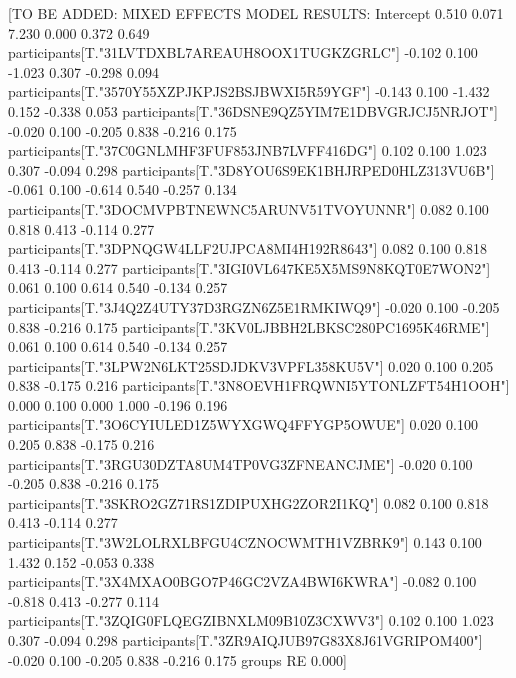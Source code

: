 \documentclass[10pt,letterpaper,twocolumn]{article}
\begin{document}
[TO BE ADDED: MIXED EFFECTS MODEL RESULTS:
Intercept                                         0.510    0.071  7.230 0.000  0.372  0.649
participants[T."31LVTDXBL7AREAUH8OOX1TUGKZGRLC"] -0.102    0.100 -1.023 0.307 -0.298  0.094
participants[T."3570Y55XZPJKPJS2BSJBWXI5R59YGF"] -0.143    0.100 -1.432 0.152 -0.338  0.053
participants[T."36DSNE9QZ5YIM7E1DBVGRJCJ5NRJOT"] -0.020    0.100 -0.205 0.838 -0.216  0.175
participants[T."37C0GNLMHF3FUF853JNB7LVFF416DG"]  0.102    0.100  1.023 0.307 -0.094  0.298
participants[T."3D8YOU6S9EK1BHJRPED0HLZ313VU6B"] -0.061    0.100 -0.614 0.540 -0.257  0.134
participants[T."3DOCMVPBTNEWNC5ARUNV51TVOYUNNR"]  0.082    0.100  0.818 0.413 -0.114  0.277
participants[T."3DPNQGW4LLF2UJPCA8MI4H192R8643"]  0.082    0.100  0.818 0.413 -0.114  0.277
participants[T."3IGI0VL647KE5X5MS9N8KQT0E7WON2"]  0.061    0.100  0.614 0.540 -0.134  0.257
participants[T."3J4Q2Z4UTY37D3RGZN6Z5E1RMKIWQ9"] -0.020    0.100 -0.205 0.838 -0.216  0.175
participants[T."3KV0LJBBH2LBKSC280PC1695K46RME"]  0.061    0.100  0.614 0.540 -0.134  0.257
participants[T."3LPW2N6LKT25SDJDKV3VPFL358KU5V"]  0.020    0.100  0.205 0.838 -0.175  0.216
participants[T."3N8OEVH1FRQWNI5YTONLZFT54H1OOH"]  0.000    0.100  0.000 1.000 -0.196  0.196
participants[T."3O6CYIULED1Z5WYXGWQ4FFYGP5OWUE"]  0.020    0.100  0.205 0.838 -0.175  0.216
participants[T."3RGU30DZTA8UM4TP0VG3ZFNEANCJME"] -0.020    0.100 -0.205 0.838 -0.216  0.175
participants[T."3SKRO2GZ71RS1ZDIPUXHG2ZOR2I1KQ"]  0.082    0.100  0.818 0.413 -0.114  0.277
participants[T."3W2LOLRXLBFGU4CZNOCWMTH1VZBRK9"]  0.143    0.100  1.432 0.152 -0.053  0.338
participants[T."3X4MXAO0BGO7P46GC2VZA4BWI6KWRA"] -0.082    0.100 -0.818 0.413 -0.277  0.114
participants[T."3ZQIG0FLQEGZIBNXLM09B10Z3CXWV3"]  0.102    0.100  1.023 0.307 -0.094  0.298
participants[T."3ZR9AIQJUB97G83X8J61VGRIPOM400"] -0.020    0.100 -0.205 0.838 -0.216  0.175
groups RE                                         0.000]



\end{document}
